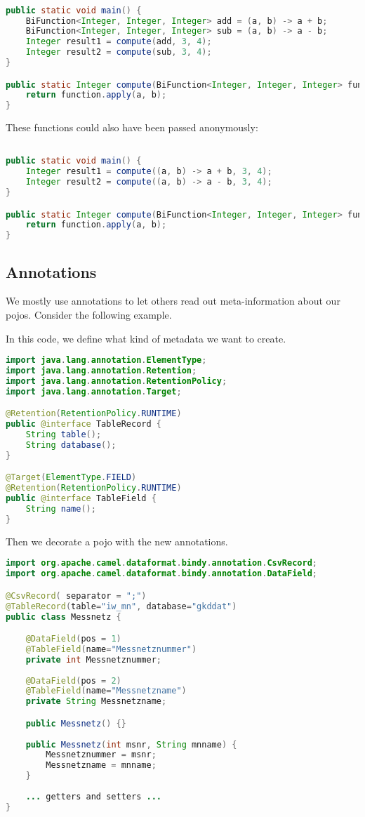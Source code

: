 \begin{lstlisting}[language=java]

public static void main() {
    BiFunction<Integer, Integer, Integer> add = (a, b) -> a + b;
    BiFunction<Integer, Integer, Integer> sub = (a, b) -> a - b;
    Integer result1 = compute(add, 3, 4);
    Integer result2 = compute(sub, 3, 4);
}

public static Integer compute(BiFunction<Integer, Integer, Integer> function, Integer a, Integer b) {
    return function.apply(a, b);
}
\end{lstlisting}

These functions could also have been passed anonymously: 
\begin{lstlisting}[language=java]

public static void main() {
    Integer result1 = compute((a, b) -> a + b, 3, 4);
    Integer result2 = compute((a, b) -> a - b, 3, 4);
}

public static Integer compute(BiFunction<Integer, Integer, Integer> function, Integer a, Integer b) {
    return function.apply(a, b);
}
\end{lstlisting}


\subsection{Annotations}
We mostly use annotations to let others read out meta-information about our pojos. Consider the following example. 

In this code, we define what kind of metadata we want to create. 
\begin{lstlisting}[language=java]
import java.lang.annotation.ElementType;
import java.lang.annotation.Retention;
import java.lang.annotation.RetentionPolicy;
import java.lang.annotation.Target;

@Retention(RetentionPolicy.RUNTIME)
public @interface TableRecord {
	String table();
	String database();
}

@Target(ElementType.FIELD)
@Retention(RetentionPolicy.RUNTIME)
public @interface TableField {
	String name();
}
\end{lstlisting}

Then we decorate a pojo with the new annotations. 
\begin{lstlisting}[language=java]
import org.apache.camel.dataformat.bindy.annotation.CsvRecord;
import org.apache.camel.dataformat.bindy.annotation.DataField;

@CsvRecord( separator = ";")
@TableRecord(table="iw_mn", database="gkddat")
public class Messnetz {

	@DataField(pos = 1)
	@TableField(name="Messnetznummer")
	private int Messnetznummer;
	
	@DataField(pos = 2)
	@TableField(name="Messnetzname")
	private String Messnetzname;

	public Messnetz() {}
	
	public Messnetz(int msnr, String mnname) {
		Messnetznummer = msnr; 
		Messnetzname = mnname;
	}
	
	... getters and setters ...
}

\end{lstlisting}

